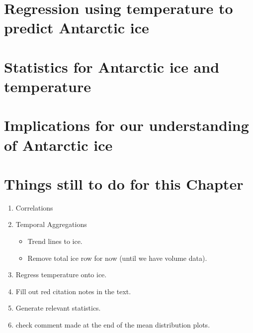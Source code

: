 \documentclass[../main.tex]{subfiles}
\begin{document}
\section{Regression using temperature to predict Antarctic ice}
\label{sec:regressions_temp_ice}

\section{Statistics for Antarctic ice and temperature}

\section{Implications for our understanding of Antarctic ice          }

\pagebreak
\section*{Things still to do for this Chapter}
\begin{enumerate}
    \item Correlations
    \item Temporal Aggregations
    \begin{itemize}
        \item Trend lines to ice.
        \item Remove total ice row for now (until we have volume data).
    \end{itemize}
    \item Regress temperature onto ice.
    \item Fill out red citation notes in the text.
    \item Generate relevant statistics.
    \item check comment made at the end of the mean distribution plots.
\end{enumerate}
\end{document}
